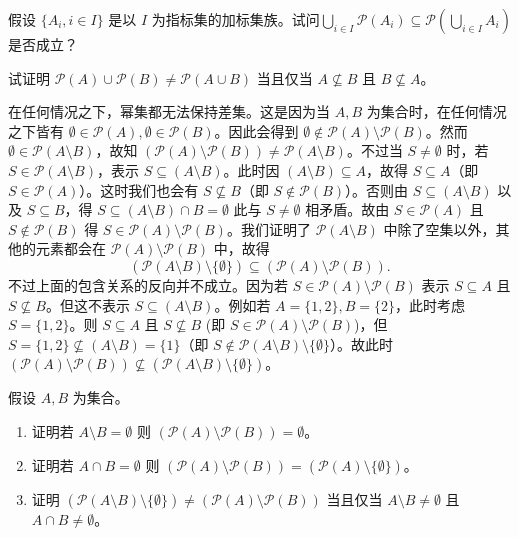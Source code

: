 \begin{question}
假设 $\{A_i, i \in I\}$ 是以 $I$ 为指标集的加标集族。试问\linebreak $\bigcup_{i \in I} \mathcal{P}(A_i) \subseteq \mathcal{P}(\bigcup_{i \in I} A_i)$ 是否成立？
\end{question}

\begin{question}
试证明 $\mathcal{P}(A) \cup \mathcal{P}(B) \neq \mathcal{P}(A \cup B)$ 当且仅当 $A \nsubseteq B$ 且 $B \nsubseteq A$。
\end{question}

在任何情况之下，幂集都无法保持差集。这是因为当 $A, B$ 为集合时，在任何情况之下皆有 $\emptyset \in \mathcal{P}(A), \emptyset \in \mathcal{P}(B)$。因此会得到 $\emptyset \notin \mathcal{P}(A) \setminus \mathcal{P}(B)$。然而 $\emptyset \in \mathcal{P}(A \setminus B)$，故知 $(\mathcal{P}(A) \setminus \mathcal{P}(B)) \neq \mathcal{P}(A \setminus B)$。不过当 $S \neq \emptyset$ 时，若 $S \in \mathcal{P}(A \setminus B)$，表示 $S \subseteq (A \setminus B)$。此时因 $(A \setminus B) \subseteq A$，故得 $S \subseteq A$（即 $S \in \mathcal{P}(A)$）。这时我们也会有 $S \nsubseteq B$（即 $S \notin \mathcal{P}(B)$）。否则由 $S \subseteq (A \setminus B)$ 以及 $S \subseteq B$，得 $S \subseteq (A \setminus B) \cap B = \emptyset$ 此与 $S \neq \emptyset$ 相矛盾。故由 $S \in \mathcal{P}(A)$ 且 $S \notin \mathcal{P}(B)$ 得 $S \in \mathcal{P}(A) \setminus \mathcal{P}(B)$。我们证明了 $\mathcal{P}(A \setminus B)$ 中除了空集以外，其他的元素都会在 $\mathcal{P}(A) \setminus \mathcal{P}(B)$ 中，故得
\begin{equation}
(\mathcal{P}(A \setminus B) \setminus \{\emptyset\}) \subseteq (\mathcal{P}(A) \setminus \mathcal{P}(B)).
\end{equation}
不过上面的包含关系的反向并不成立。因为若 $S \in \mathcal{P}(A) \setminus \mathcal{P}(B)$ 表示 $S \subseteq A$ 且 $S \nsubseteq B$。但这不表示 $S \subseteq (A \setminus B)$。例如若 $A = \{1, 2\}, B = \{2\}$，此时考虑 $S = \{1, 2\}$。则 $S \subseteq A$ 且 $S \nsubseteq B$ (即 $S \in \mathcal{P}(A) \setminus \mathcal{P}(B)$)，但 $S = \{1, 2\} \nsubseteq (A \setminus B) = \{1\}$（即 $S \notin \mathcal{P}(A \setminus B) \setminus \{\emptyset\}$）。故此时 $(\mathcal{P}(A) \setminus \mathcal{P}(B)) \nsubseteq (\mathcal{P}(A \setminus B) \setminus \{\emptyset\})$。

\begin{question}
假设 $A, B$ 为集合。
\begin{enumerate}
  \item 证明若 $A \setminus B = \emptyset$ 则 $(\mathcal{P}(A) \setminus \mathcal{P}(B)) = \emptyset$。
  \item 证明若 $A \cap B = \emptyset$ 则 $(\mathcal{P}(A) \setminus \mathcal{P}(B)) = (\mathcal{P}(A) \setminus \{\emptyset\})$。
  \item 证明 $(\mathcal{P}(A \setminus B) \setminus \{\emptyset\}) \neq (\mathcal{P}(A) \setminus \mathcal{P}(B))$ 当且仅当 $A \setminus B \neq \emptyset$ 且 $A \cap B \neq \emptyset$。
\end{enumerate}
\end{question}

